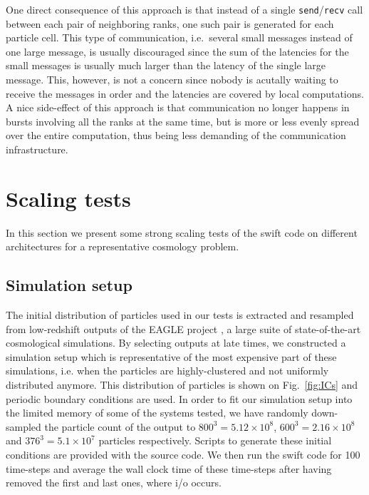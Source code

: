 \documentclass{sig-alternate-05-2015}
\newcommand{\swift}{{\sc swift}\xspace}
\begin{document}
One direct consequence of this approach is that instead of a single
{\tt send}/{\tt recv} call between each pair of neighboring ranks,
one such pair is generated for each particle cell.
This type of communication, i.e.~several small messages instead of
one large message, is usually discouraged since the sum of the latencies
for the small messages is usually much larger than the latency of
the single large message.
This, however, is not a concern since nobody is acutally waiting
to receive the messages in order and the latencies are covered
by local computations.
A nice side-effect of this approach is that communication no longer
happens in bursts involving all the ranks at the same time, but
is more or less evenly spread over the entire computation, thus
being less demanding of the communication infrastructure.




\section{Scaling tests}

In this section we present some strong scaling tests of the \swift code on different
architectures for a representative cosmology problem.

\subsection{Simulation setup}

The initial distribution of particles used in our tests is extracted and
resampled from low-redshift outputs of the EAGLE project \cite{Schaye2015}, a
large suite of state-of-the-art cosmological simulations. By selecting outputs
at late times, we constructed a simulation setup which is representative of the
most expensive part of these simulations, i.e. when the particles are
highly-clustered and not uniformly distributed anymore. This distribution of
particles is shown on Fig.~\ref{fig:ICs} and periodic boundary conditions are
used. In order to fit our simulation setup into the limited memory of some of
the systems tested, we have randomly down-sampled the particle count of the
output to $800^3=5.12\times10^8$, $600^3=2.16\times10^8$ and
$376^3=5.1\times10^7$ particles respectively. Scripts to generate these initial
conditions are provided with the source code. We then run the \swift code for
100 time-steps and average the wall clock time of these time-steps after having
removed the first and last ones, where i/o occurs.
\end{document}
